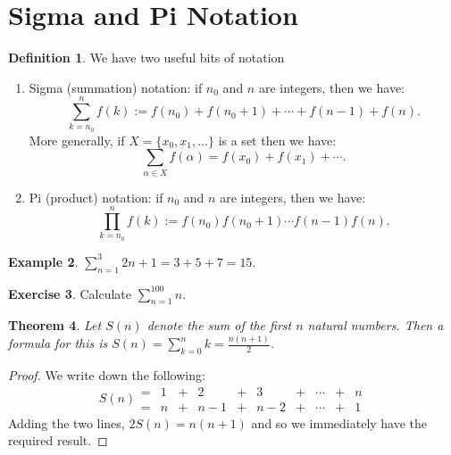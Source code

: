 \documentclass[a4paper, 10pt]{amsart}
\newtheorem{thm}{Theorem}[section]
\theoremstyle{definition}
\newtheorem{defn}[thm]{Definition}
\newtheorem{ex}[thm]{Example}
\newtheorem{exercise}[thm]{Exercise}
\theoremstyle{remark}
\begin{document}
\section{Sigma and Pi Notation}
\begin{defn}
  We have two useful bits of notation
  \begin{enumerate}
    \item Sigma (summation) notation: if $ n_0 $ and $ n $ are integers, then we have:
          \begin{displaymath}
            \sum^{n}_{k = n_0} f(k) := f(n_0) + f(n_0 + 1) + \cdots + f(n - 1) + f(n).
          \end{displaymath}
          More generally, if $ X = \{x_0, x_1, \dots \} $ is a set then we have:
          \begin{displaymath}
            \sum_{\alpha \in X} f(\alpha) = f(x_0) + f(x_1) + \cdots.
          \end{displaymath}
    \item Pi (product) notation: if $ n_0 $ and $ n $ are integers, then we have:
          \begin{displaymath}
            \prod^{n}_{k = n_0} f(k) := f(n_0) f(n_0 + 1) \cdots f(n - 1) f(n).
          \end{displaymath}
  \end{enumerate}
\end{defn}

\begin{ex}
  $ \sum_{n = 1}^{3} 2n + 1 = 3 + 5 + 7 = 15 $.
\end{ex}

\begin{exercise}
  Calculate $ \sum_{n = 1}^{100} n $.
\end{exercise}

\begin{thm}
  Let $ S(n) $ denote the sum of the first $ n $ natural numbers. Then a formula for this is $ S(n) = \sum_{k = 0}^n k = \frac{n(n+1)}{2} $.
\end{thm}
\begin{proof}
  We write down the following:
  \begin{displaymath}
    S(n) \begin{array}{cccccccccc}
           = & 1 &+& 2 &+& 3 &+& \cdots &+& n\\
           = & n &+& n-1 &+& n-2 &+& \cdots &+& 1
         \end{array}
  \end{displaymath}
  Adding the two lines, $ 2S(n) = n(n+1) $ and so we immediately have the required result.
\end{proof}
\end{document}
